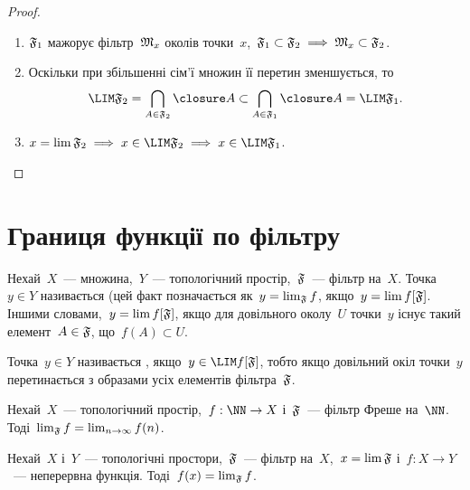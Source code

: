 \begin{proof}
    \listhack
    \begin{enumerate}
        \item $\frak F_1$ мажорує фільтр~$\frak M_x$ околів точки~$x$,~$\frak F_1 \subset \frak F_2 \implies \frak M_x \subset \frak F_2$.

        \item Оскільки при збільшенні сім'ї множин її перетин зменшується, то
        \begin{equation*}
            \LIM \frak F_2 = \bigcap_{A \in \frak F_2} \closure A \subset \bigcap_{A \in \frak F_1} \closure A = \LIM \frak F_1.
        \end{equation*}

        \item $x = \lim \frak F_2 \implies x \in \LIM \frak F_2 \implies x \in \LIM \frak F_1$. \qedhere
    \end{enumerate}
\end{proof}

\section{Границя функції по фільтру}

\begin{definition}
    Нехай~$X$~--- множина,~$Y$~--- топологічний простір,~$\frak F$~--- фільтр на~$X$. Точка~$y \in Y$ називається  (цей факт позначається як~$y = \lim_{\frak F} f$, якщо~$y = \lim f[\frak F]$. Іншими словами,~$y = \lim f [\frak F]$, якщо для довільного околу~$U$ точки~$y$ існує такий елемент~$A \in \frak F$, що~$f(A) \subset U$.
\end{definition}

\begin{definition}
    Точка~$y \in Y$ називається , якщо~$y \in \LIM f[\frak F]$, тобто якщо довільний окіл точки~$y$ перетинається з образами усіх елементів фільтра~$\frak F$.
\end{definition}

\begin{example}
    Нехай~$X$~--- топологічний простір,~$f: \NN \to X$ і~$\frak F$~--- фільтр Фреше на~$\NN$. Тоді~$\lim_{\frak F} f = \lim_{n \to \infty} f(n)$.
\end{example}

\begin{theorem}
    \label{th:filter-continuity}
    Нехай~$X$ і~$Y$~--- топологічні простори,~$\frak F$~--- фільтр на~$X$,~$x = \lim \frak F$ і~$f: X \to Y$~--- неперервна функція. Тоді~$f(x) = \lim_{\frak F} f$.
\end{theorem}

